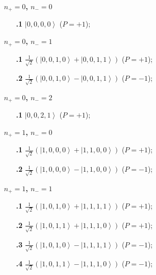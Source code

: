 \begin{itemize}
\item[\textbf{$n_{+} = 0$, $n_{-} = 0$}]
\begin{itemize}
\item[\textbf{.1}] $\left| 0,0,0,0 \right>$ ($P=+1$);
\end{itemize}

\item[\textbf{$n_{+} = 0$, $n_{-} = 1$}]
\begin{itemize}
\item[\textbf{.1}] $\frac{1}{\sqrt{2}}\left( \left| 0,0,1,0 \right> + \left| 0,0,1,1 \right> \right)$ ($P=+1$);
\item[\textbf{.2}] $\frac{1}{\sqrt{2}}\left( \left| 0,0,1,0 \right> - \left| 0,0,1,1 \right> \right)$ ($P=-1$);
\end{itemize}

\item[\textbf{$n_{+} = 0$, $n_{-} = 2$}]
\begin{itemize}
\item[\textbf{.1}] $\left| 0,0,2,1 \right>$ ($P=+1$);
\end{itemize}

\item[\textbf{$n_{+} = 1$, $n_{-} = 0$}]
\begin{itemize}
\item[\textbf{.1}] $\frac{1}{\sqrt{2}}\left( \left| 1,0,0,0 \right> + \left| 1,1,0,0 \right> \right)$ ($P=+1$);
\item[\textbf{.2}] $\frac{1}{\sqrt{2}}\left( \left| 1,0,0,0 \right> - \left| 1,1,0,0 \right> \right)$ ($P=-1$);
\end{itemize}

\item[\textbf{$n_{+} = 1$, $n_{-} = 1$}]
\begin{itemize}
\item[\textbf{.1}] $\frac{1}{\sqrt{2}}\left( \left| 1,0,1,0 \right> + \left| 1,1,1,1 \right> \right)$ ($P=+1$);
\item[\textbf{.2}] $\frac{1}{\sqrt{2}}\left( \left| 1,0,1,1 \right> + \left| 1,1,1,0 \right> \right)$ ($P=+1$);
\item[\textbf{.3}] $\frac{1}{\sqrt{2}}\left( \left| 1,0,1,0 \right> - \left| 1,1,1,1 \right> \right)$ ($P=-1$);
\item[\textbf{.4}] $\frac{1}{\sqrt{2}}\left( \left| 1,0,1,1 \right> - \left| 1,1,1,0 \right> \right)$ ($P=-1$);
\end{itemize}


\end{itemize}
